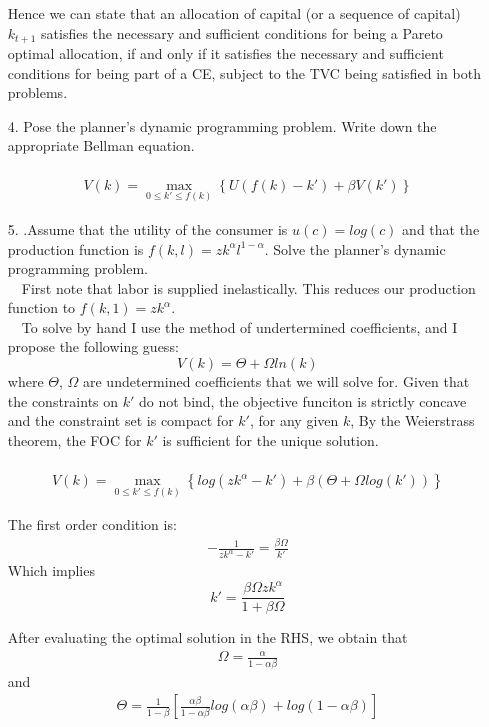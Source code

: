 \documentclass[a4paper]{article}
\begin{document}
\begin{enumerate}
Hence we can state that an allocation of capital (or a sequence of capital) $k_{t+1}$ satisfies the necessary and sufficient conditions for being a Pareto optimal allocation, if and only if it satisfies the necessary and sufficient conditions for being part of a CE, subject to the TVC being satisfied in both problems.
\item[4.] Pose the planner’s dynamic programming problem. Write down the appropriate Bellman equation.\\~\
\begin{align*}
V(k) = \max_{0\leq k' \leq f(k)} \left\lbrace U(f(k) - k') + \beta V(k') \right\rbrace
\end{align*}
\item[5.].Assume that the utility of the consumer is $u(c) = log(c)$ and that the production function is $f(k,l) = zk^\alpha l^{1-\alpha}$. Solve the planner's dynamic programming problem.\\~\ 
First note that labor is supplied inelastically. This reduces our production function to $f(k,1) = zk^\alpha $. \\~\
To solve by hand I use the method of undertermined coefficients, and I propose the following guess:
\begin{equation}
V(k) = \Theta+ \Omega ln(k)
\end{equation}
where $\Theta$, $\Omega$ are undetermined coefficients that we will solve for. Given that the constraints on $k'$ do not bind, the objective funciton is strictly concave and the constraint set is compact for $k'$, for any given $k$, By the Weierstrass theorem, the FOC for $k'$ is sufficient for the unique solution.\\~\
\begin{align*}
V(k) = \max_{0\leq k' \leq f(k)} \left\lbrace log(zk^\alpha - k') + \beta(\Theta+ \Omega log(k')) \right\rbrace
\end{align*}

The first order condition is:
\begin{align*}
-\frac{1}{zk^\alpha - k'} = \frac{\beta \Omega}{k'}
\end{align*}
Which implies 
\begin{equation*}
k' = \frac{\beta \Omega z k^\alpha}{1+\beta \Omega}
\end{equation*}

After evaluating the optimal solution in the RHS, we obtain that 
\begin{align*}
\Omega = \frac{\alpha}{1-\alpha \beta}
\end{align*}
and
\begin{align*}
\Theta=\frac{1}{1-\beta} \left[ \frac{\alpha \beta}{1-\alpha \beta} log(\alpha \beta) + log(1-\alpha \beta) \right]
\end{align*}



\end{enumerate}
\end{document}
